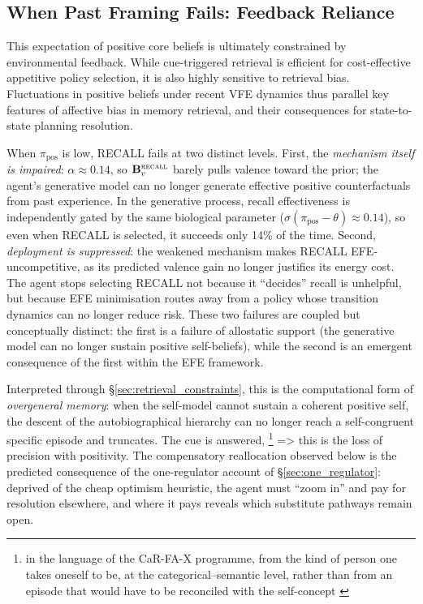 \documentclass[11pt,a4paper]{article}
\newcommand{\rr}{\color{red!70!black}}
\begin{document}
\subsection{When Past Framing Fails: Feedback Reliance}\label{sec:feedback_reliance}

This expectation of positive core beliefs is ultimately constrained by environmental feedback. While cue-triggered retrieval is efficient for cost-effective appetitive policy selection, it is also highly sensitive to retrieval bias. Fluctuations in positive beliefs under recent VFE dynamics thus parallel key features of affective bias in memory retrieval, and their consequences for state-to-state planning resolution.

When $\pi_{\text{pos}}$ is low, RECALL fails at two distinct levels. First, the \emph{mechanism itself is impaired}: $\alpha \approx 0.14$, so $\mathbf{B}_v^{\textsc{recall}}$ barely pulls valence toward the prior; the agent's generative model can no longer generate effective positive counterfactuals from past experience. In the generative process, recall effectiveness is independently gated by the same biological parameter ($\sigma(\pi_{\text{pos}} - \theta) \approx 0.14$), so even when RECALL is selected, it succeeds only 14\% of the time. Second, \emph{deployment is suppressed}: the weakened mechanism makes RECALL EFE-uncompetitive, as its predicted valence gain no longer justifies its energy cost. The agent stops selecting RECALL not because it ``decides'' recall is unhelpful, but because EFE minimisation routes away from a policy whose transition dynamics can no longer reduce risk. These two failures are coupled but conceptually distinct: the first is a failure of allostatic support (the generative model can no longer sustain positive self-beliefs), while the second is an emergent consequence of the first within the EFE framework.

{\rr Interpreted through \S\ref{sec:retrieval_constraints}, this is the computational form of \emph{overgeneral memory}: when the self-model cannot sustain a coherent positive self, the descent of the autobiographical hierarchy can no longer reach a self-congruent specific episode and truncates. The cue is answered, \footnote{in the language of the CaR-FA-X programme, from the kind of person one takes oneself to be, at the categorical--semantic level, rather than from an episode that would have to be reconciled with the self-concept \citep{williamsetal2007, watkinsteasdale2001}} => this is the loss of precision with positivity. The compensatory reallocation observed below is the predicted consequence of the one-regulator account of \S\ref{sec:one_regulator}: deprived of the cheap optimism heuristic, the agent must ``zoom in'' and pay for resolution elsewhere, and where it pays reveals which substitute pathways remain open.}
\end{document}
